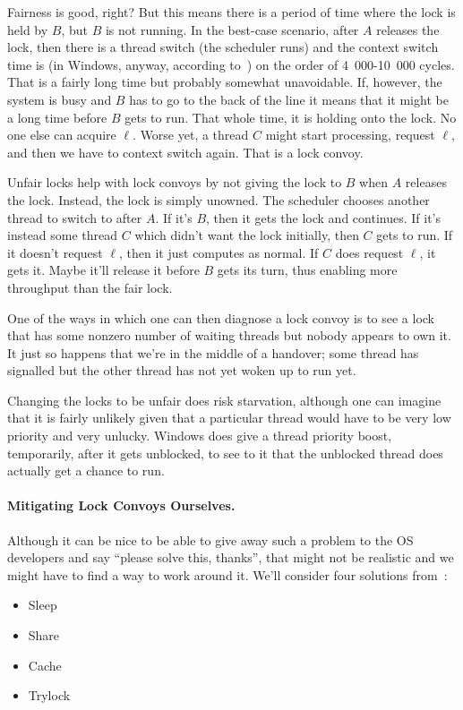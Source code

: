 \documentclass[a4paper]{report}
\begin{document}
Fairness is good, right? But this means there is a period of time where the lock is held by $B$, but $B$ is not running. In the best-case scenario, after $A$ releases the lock, then there is a thread switch (the scheduler runs) and the context switch time is (in Windows, anyway, according to~\cite{anticonvoy}) on the order of 4~000-10~000 cycles. That is a fairly long time but probably somewhat unavoidable. If, however, the system is busy and $B$ has to go to the back of the line it means that it might be a long time before $B$ gets to run. That whole time, it is holding onto the lock. No one else can acquire $\ell$. Worse yet, a thread $C$ might start processing, request $\ell$, and then we have to context switch again. That is a lock convoy.

Unfair locks help with lock convoys by not giving the lock to $B$ when $A$ releases the lock. Instead, the lock is simply unowned. The scheduler chooses another thread to switch to after $A$. If it's $B$, then it gets the lock and continues. If it's instead some thread $C$ which didn't want the lock initially, then $C$ gets to run. If it doesn't request $\ell$, then it just computes as normal. If $C$ does request $\ell$, it gets it. Maybe it'll release it before $B$ gets its turn, thus enabling more throughput than the fair lock.

One of the ways in which one can then diagnose a lock convoy is to see a lock that has some nonzero number of waiting threads but nobody appears to own it. It just so happens that we're in the middle of a handover; some thread has signalled but the other thread has not yet woken up to run yet.

Changing the locks to be unfair does risk starvation, although one can imagine that it is fairly unlikely given that a particular thread would have to be very low priority and very unlucky. Windows does give a thread priority boost, temporarily, after it gets unblocked, to see to it that the unblocked thread does actually get a chance to run.

\paragraph{Mitigating Lock Convoys Ourselves.} Although it can be nice to be able to give away such a problem to the OS developers and say ``please solve this, thanks'', that might not be realistic and we might have to find a way to work around it. We'll consider four solutions from~\cite{lockconvoys}:

\begin{itemize}
	\item Sleep
	\item Share
	\item Cache
	\item Trylock
\end{itemize}
\end{document}
